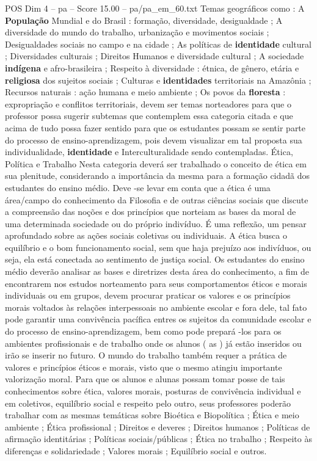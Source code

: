 \begin{textsample}{POS Dim 4 – pa – Score 15.00 – pa/pa\_em\_60.txt}
Temas geográficos como : A \textbf{População} Mundial e do Brasil : formação, diversidade, desigualdade ; A diversidade do mundo do trabalho, urbanização e movimentos sociais ; Desigualdades sociais no campo e na cidade ; As políticas de \textbf{identidade} cultural ; Diversidades culturais ; Direitos Humanos e diversidade cultural ; A sociedade \textbf{indígena} e afro-brasileira ; Respeito à diversidade : étnica, de gênero, etária e \textbf{religiosa} dos sujeitos sociais ; Culturas e \textbf{identidades} territoriais na Amazônia ; Recursos naturais : ação humana e meio ambiente ; Os povos da \textbf{floresta} : expropriação e conflitos territoriais, devem ser temas norteadores para que o professor possa sugerir subtemas que contemplem essa categoria citada e que acima de tudo possa fazer sentido para que os estudantes possam se sentir parte do processo de ensino-aprendizagem, pois devem visualizar em tal proposta sua individualidade, \textbf{identidade} e Interculturalidade sendo contempladas.
Ética, Política e Trabalho Nesta categoria deverá ser trabalhado o conceito de ética em sua plenitude, considerando a importância da mesma para a formação cidadã dos estudantes do ensino médio.
Deve -se levar em conta que a ética é uma área/campo do conhecimento da Filosofia e de outras ciências sociais que discute a compreensão das noções e dos princípios que norteiam as bases da moral de uma determinada sociedade ou do próprio indivíduo.
É uma reflexão, um pensar aprofundado sobre as ações sociais coletivas ou individuais.
A ética busca o equilíbrio e o bom funcionamento social, sem que haja prejuízo aos indivíduos, ou seja, ela está conectada ao sentimento de justiça social.
Os estudantes do ensino médio deverão analisar as bases e diretrizes desta área do conhecimento, a fim de encontrarem nos estudos norteamento para seus comportamentos éticos e morais individuais ou em grupos, devem procurar praticar os valores e os princípios morais voltados às relações interpessoais no ambiente escolar e fora dele, tal fato pode garantir uma convivência pacífica entres os sujeitos da comunidade escolar e do processo de ensino-aprendizagem, bem como pode prepará -los para os ambientes profissionais e de trabalho onde os alunos ( as ) já estão inseridos ou irão se inserir no futuro.
O mundo do trabalho também requer a prática de valores e princípios éticos e morais, visto que o mesmo atingiu importante valorização moral.
Para que os alunos e alunas possam tomar posse de tais conhecimentos sobre ética, valores morais, posturas de convivência individual e em coletivos, equilíbrio social e respeito pelo outro, seus professores poderão trabalhar com as mesmas temáticas sobre Bioética e Biopolítica ; Ética e meio ambiente ; Ética profissional ; Direitos e deveres ; Direitos humanos ; Políticas de afirmação identitárias ; Políticas sociais/públicas ; Ética no trabalho ; Respeito às diferenças e solidariedade ; Valores morais ; Equilíbrio social e outros.

\end{textsample}
